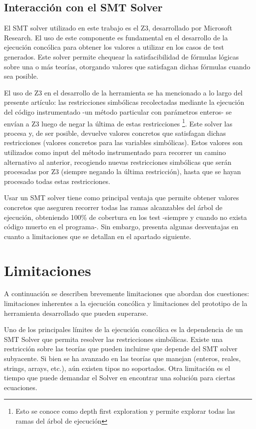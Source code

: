 \documentclass{llncs}
\begin{document}
\subsection{Interacción con el SMT Solver}
El SMT solver utilizado en este trabajo es el Z3, desarrollado por Microsoft Research. El uso de este componente es fundamental en el desarrollo
de la ejecución concólica para obtener los valores a utilizar en los casos de test generados. Este solver permite chequear la satisfacibilidad
de fórmulas lógicas sobre una o más teorías, otorgando valores que satisfagan dichas fórmulas cuando sea posible.

El uso de Z3 en el desarrollo de la herramienta se ha mencionado a lo largo del presente artículo: las restricciones simbólicas recolectadas mediante
la ejecución del código instrumentado -un método particular con parámetros enteros- se envían a Z3 luego de negar la última de estas
restricciones \footnote{Esto se conoce como depth first exploration y permite explorar todas las ramas del árbol de ejecución}. Este solver las procesa y,
de ser posible, devuelve valores concretos que satisfagan dichas restricciones (valores concretos para las variables simbólicas). Estos valores son
utilizados como input del método instrumentado para recorrer un camino alternativo al anterior, recogiendo nuevas restricciones simbólicas que serán
procesadas por Z3 (siempre negando la última restricción), hasta que se hayan procesado todas estas restricciones.

Usar un SMT solver tiene como principal ventaja que permite obtener valores concretos que aseguren recorrer todas las ramas alcanzables del árbol de ejecución,
obteniendo 100\% de cobertura en los test -siempre y cuando no exista código muerto en el programa-. Sin embargo, presenta algunas desventajas en cuanto a
limitaciones que se detallan en el apartado siguiente.

\section{Limitaciones}
A continuación se describen brevemente limitaciones que abordan dos cuestiones: limitaciones inherentes a la ejecución concólica y limitaciones
del prototipo de la herramienta desarrollado que pueden superarse.

Uno de los principales límites de la ejecución concólica es la dependencia de un SMT Solver que permita resolver las restricciones simbólicas.
Existe una res\-tric\-ción sobre las teorías que pueden incluirse que depende del SMT solver subyacente. Si bien se ha avanzado en las teorías
que manejan (enteros, reales, strings, arrays, etc.), aún existen tipos no soportados. Otra limitación es el tiempo que puede demandar el
Solver en encontrar una solución para ciertas ecuaciones.
\end{document}
